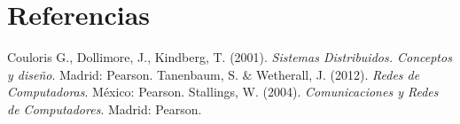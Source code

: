 \section{Referencias}
\begin{thebibliography}{0}
	Couloris G., Dollimore, J., Kindberg, T. (2001). \textit{Sistemas Distribuidos. Conceptos y dise\~no}. Madrid: Pearson.
	Tanenbaum, S. $\&$ Wetherall, J. (2012). \textit{Redes de Computadoras}. M\'exico: Pearson.
	Stallings, W. (2004). \textit{Comunicaciones y Redes de Computadores}. Madrid: Pearson.
\end{thebibliography}
\printbibliography